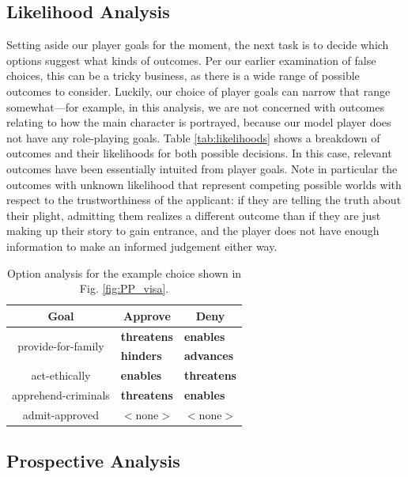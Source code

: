 \documentclass[arts,article,submit,moreauthors,pdftex,10pt,a4paper]{Definitions/mdpi}
\newcommand{\enables}{\textbf{\color{enables}enables}}
\newcommand{\advances}{\textbf{\color{advances}advances}}
\newcommand{\threatens}{\textbf{\color{threatens}threatens}}
\newcommand{\hinders}{\textbf{\color{hinders}hinders}}
\begin{document}
\subsection{Likelihood Analysis}

Setting aside our player goals for the moment, the next task is to decide which options suggest what kinds of outcomes.
%
Per our earlier examination of false choices, this can be a tricky business, as there is a wide range of possible outcomes to consider.
%
Luckily, our choice of player goals can narrow that range somewhat---for example, in this analysis, we are not concerned with outcomes relating to how the main character is portrayed, because our model player does not have any role-playing goals.
%
Table \ref{tab:likelihoods} shows a breakdown of outcomes and their likelihoods for both possible decisions.
%
In this case, relevant outcomes have been essentially intuited from player goals.
%
Note in particular the outcomes with unknown likelihood that represent competing possible worlds with respect to the trustworthiness of the applicant: if they are telling the truth about their plight, admitting them realizes a different outcome than if they are just making up their story to gain entrance, and the player does not have enough information to make an informed judgement either way.


\begin{table}[H]
\centering
\begin{tabular}{c l l}
  \toprule
  \textbf{Goal} & \multicolumn{1}{c}{\textbf{Approve}} & \multicolumn{1}{c}{\textbf{Deny}} \\
  \midrule
  \multirow{2}{9em}{\centering provide-for-family} & \threatens{} & \enables{} \\
                                        & \hinders{} & \advances{} \\
  \midrule
  act-ethically & \enables{} & \threatens{} \\
  \midrule
  apprehend-criminals & \threatens{} & \enables{} \\
  \midrule
  admit-approved & $<$none$>$ & $<$none$>$ \\
  \bottomrule
\end{tabular}
\caption[Example option analysis]{Option analysis for the example choice shown in Fig. \ref{fig:PP_visa}.}
\label{tab:options}
\end{table}

\subsection{Prospective Analysis}
\end{document}
